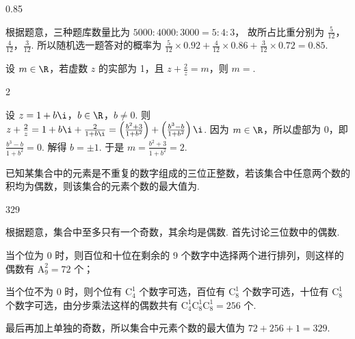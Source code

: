 \begin{answer}
0.85
\end{answer}

\begin{solution}
根据题意，三种题库数量比为
\(5000:4000:3000=5:4:3\)，
故所占比重分别为
\(\frac{5}{12}\)，\(\frac{4}{12}\)，\(\frac{3}{12}\).
所以随机选一题答对的概率为
\(\frac{5}{12}\times 0.92+\frac{4}{12}\times 0.86+\frac{3}{12}\times 0.72=0.85\).
\end{solution}

\begin{problem}
设 \(m\in \R\)，若虚数 \(z\) 的实部为 1，且 \(z+\frac{2}{z}=m\)，则 \(m=\)\fillinblank{}.
\end{problem}

\begin{answer}
2
\end{answer}

\begin{solution}
设
\(z=1+b\i\)，\(b\in \R\)，\(b\ne 0\).
则
\(z+\frac{2}{z}=1+b\i+\frac{2}{1+b\i} =\left( \frac{b^2+3}{1+b^2} \right)+\left( \frac{b^3-b}{1+b^2} \right)\i\).
因为 \(m\in \R\)，所以虚部为 0，即
\(\frac{b^3-b}{1+b^2}=0\).
解得 \(b=\pm 1\). 于是
\(m=\frac{b^2+3}{1+b^2}=2\).
\end{solution}

\begin{problem}
已知某集合中的元素是不重复的数字组成的三位正整数，若该集合中任意两个数的积均为偶数，则该集合的元素个数的最大值为\fillinblank{}.
\end{problem}

\begin{answer}
329
\end{answer}

\begin{solution}
根据题意，集合中至多只有一个奇数，其余均是偶数. 首先讨论三位数中的偶数.

\begin{circlelist}
\item 当个位为 \(0\) 时，则百位和十位在剩余的 \(9\) 个数字中选择两个进行排列，则这样的偶数有
\(\mathrm A_9^2=72\)
个；

\item 当个位不为 \(0\) 时，则个位有 \(\mathrm C_4^1\) 个数字可选，百位有 \(\mathrm C_8^1\) 个数字可选，十位有 \(\mathrm C_8^1\) 个数字可选，由分步乘法这样的偶数共有
\(\mathrm C_4^1\mathrm C_8^1\mathrm C_8^1=256\)
个.
\end{circlelist}
最后再加上单独的奇数，所以集合中元素个数的最大值为
\(72+256+1=329\).
\end{solution}

